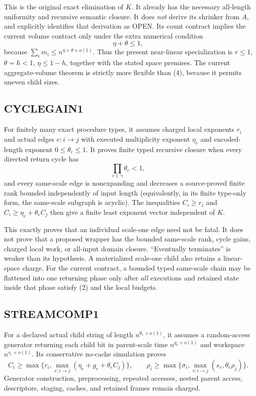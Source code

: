 \documentclass[11pt]{article}
\begin{document}
This is the original exact elimination of $K$.  It already has the necessary
all-length uniformity and recursive semantic closure.  It does \emph{not}
derive its shrinker from $A$, and explicitly identifies that derivation as
OPEN.  Its count contract implies the current volume contract only under the
extra numerical condition
\[
 \eta+\theta\le1,
 \tag{4}
\]
because $\sum_i m_i\le n^{\eta+\theta+o(1)}$.  Thus the present near-linear
specialization is $r\le1$, $\theta=h<1$, $\eta\le1-h$, together with the
stated space premises.  The current aggregate-volume theorem is strictly
more flexible than (4), because it permits uneven child sizes.

\subsection*{CYCLEGAIN1}
For finitely many exact procedure types, it assumes charged local exponents
$r_i$ and actual edges $e:i\to j$ with executed multiplicity exponent
$\eta_e$ and encoded-length exponent $0\le\theta_e\le1$.  It proves finite
typed recursive closure when every directed return cycle has
\[
 \prod_{e\in\gamma}\theta_e<1,
 \tag{5}
\]
and every same-scale edge is nonexpanding and decreases a source-proved finite
rank bounded independently of input length (equivalently, in its finite
type-only form, the same-scale subgraph is acyclic).  The inequalities
$C_i\ge r_i$ and $C_i\ge\eta_e+\theta_eC_j$ then give a finite least exponent
vector independent of $K$.

This exactly proves that an individual scale-one edge need not be fatal.
It does not prove that a proposed wrapper has the bounded same-scale rank,
cycle gains, charged local work, or all-input domain closure.  ``Eventually
terminates'' is weaker than its hypothesis.  A materialized scale-one child
also retains a linear-space charge.  For the current contract, a bounded
typed same-scale chain may be flattened into one returning phase only after
\emph{all} executions and retained state inside that phase satisfy (2) and
the local budgets.

\subsection*{STREAMCOMP1}
For a declared actual child string of length $n^{\theta_e+o(1)}$, it assumes a
random-access generator returning each child bit in parent-scale time
$n^{g_e+o(1)}$ and workspace $n^{s_e+o(1)}$.  Its conservative no-cache
simulation proves
\[
 C_i\ge\max\{r_i,\max_{e:i\to j}(\eta_e+g_e+\theta_eC_j)\},
 \qquad
 \rho_i\ge\max\{\sigma_i,\max_{e:i\to j}(s_e,\theta_e\rho_j)\}.
 \tag{6}
\]
Generator construction, preprocessing, repeated accesses, nested parent
access, descriptors, staging, caches, and retained frames remain charged.
\end{document}
